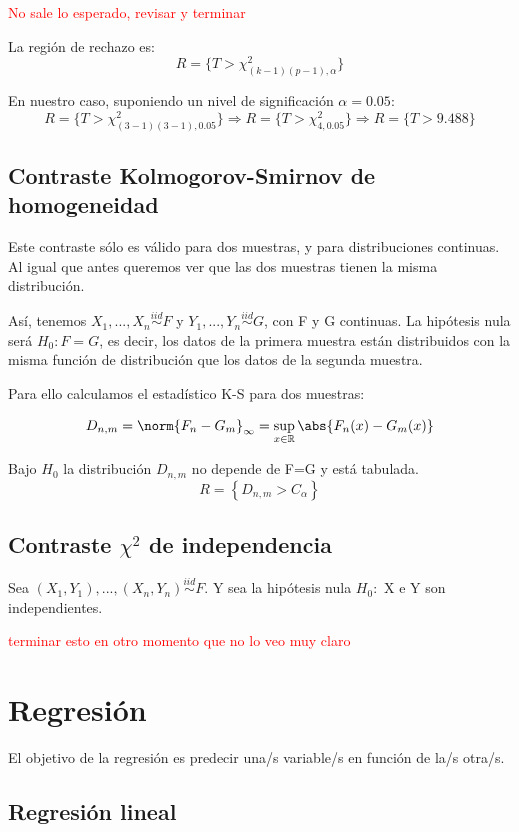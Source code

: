 \documentclass[palatino,nochap]{apuntes}
\begin{document}
\begin{example}
\textcolor{red}{No sale lo esperado, revisar y terminar}

La región de rechazo es:
$$ R=\{T > \chi^2_{(k-1)(p-1),\alpha}\}$$

En nuestro caso, suponiendo un nivel de significación $\alpha=0.05$:
$$ R=\{T > \chi^2_{(3-1)(3-1),0.05}\} \Rightarrow R=\{T > \chi^2_{4,0.05}\} \Rightarrow  R=\{T > 9.488\}$$
\end{example}

\section{Contraste Kolmogorov-Smirnov de homogeneidad}
Este contraste sólo es válido para dos muestras, y para distribuciones continuas. Al igual que antes queremos ver que las dos muestras tienen la misma distribución.

Así, tenemos $X_1,...,X_n \stackrel{iid}{\sim} F$ y $Y_1,...,Y_n \stackrel{iid}{\sim} G$, con F y G continuas. La hipótesis nula será $H_0: F=G$, es decir, los datos de la primera muestra están distribuidos con la misma función de distribución que los datos de la segunda muestra.

Para ello calculamos el estadístico K-S para dos muestras:

$$D_{n,m} = \norm{F_n -G_m}_{\infty} = \sup_{x \in \mathbb{R}} \abs{F_n(x)-G_m(x)}  $$

Bajo $H_0$ la distribución $D_{n,m}$ no depende de F=G y está tabulada.
$$ R=\left\{D_{n,m} > C_{\alpha}\right\} $$

\section{Contraste $\chi^2$ de independencia}
Sea $(X_1, Y_1),...,(X_n, Y_n) \stackrel{iid}{\sim} F$. Y sea la hipótesis nula $H_0 :$ X e Y son independientes.

\textcolor{red}{terminar esto en otro momento que no lo veo muy claro}


\chapter{Regresión}
El objetivo de la regresión es predecir una/s variable/s en función de la/s otra/s.


\section{Regresión lineal}
\end{document}
